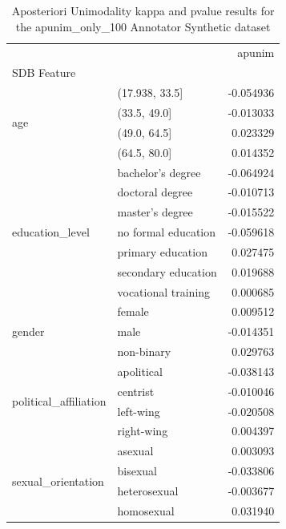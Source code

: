 \begin{table}
\caption{Aposteriori Unimodality kappa and pvalue results for the apunim_only_100 Annotator Synthetic dataset}
\label{tab:results_apunim_only_100}
\begin{tabular}{llr}
\toprule
 &  & apunim \\
SDB Feature &  &  \\
\midrule
\multirow[t]{4}{*}{age} & (17.938, 33.5] & -0.054936 \\
 & (33.5, 49.0] & -0.013033 \\
 & (49.0, 64.5] & 0.023329 \\
 & (64.5, 80.0] & 0.014352 \\
\cline{1-3}
\multirow[t]{7}{*}{education\_level} & bachelor's degree & -0.064924 \\
 & doctoral degree & -0.010713 \\
 & master's degree & -0.015522 \\
 & no formal education & -0.059618 \\
 & primary education & 0.027475 \\
 & secondary education & 0.019688 \\
 & vocational training & 0.000685 \\
\cline{1-3}
\multirow[t]{3}{*}{gender} & female & 0.009512 \\
 & male & -0.014351 \\
 & non-binary & 0.029763 \\
\cline{1-3}
\multirow[t]{4}{*}{political\_affiliation} & apolitical & -0.038143 \\
 & centrist & -0.010046 \\
 & left-wing & -0.020508 \\
 & right-wing & 0.004397 \\
\cline{1-3}
\multirow[t]{4}{*}{sexual\_orientation} & asexual & 0.003093 \\
 & bisexual & -0.033806 \\
 & heterosexual & -0.003677 \\
 & homosexual & 0.031940 \\
\cline{1-3}
\bottomrule
\end{tabular}
\end{table}
